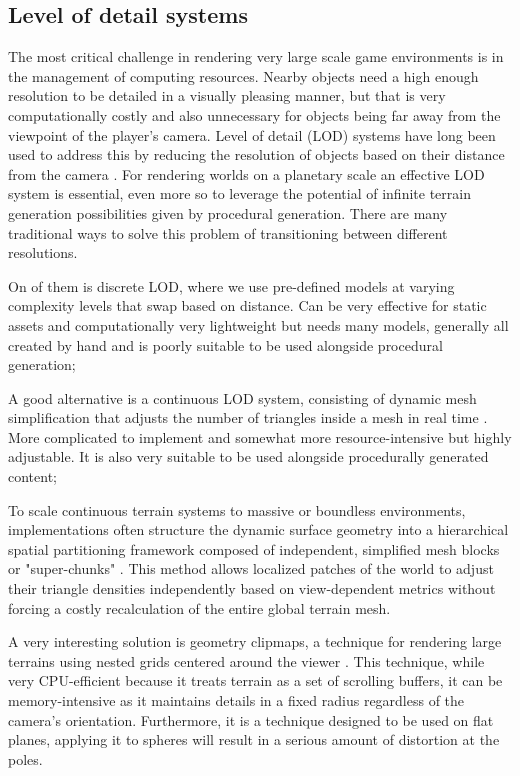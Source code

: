 \documentclass[12pt]{report}
\begin{document}
\subsection{Level of detail systems}

The most critical challenge in rendering very large scale game environments is in the management of computing resources. Nearby objects need a high enough resolution to be detailed in a visually pleasing manner, but that is very computationally costly and also unnecessary for objects being far away from the viewpoint of the player's camera. Level of detail (LOD) systems have long been used \cite{clark1976} to address this by reducing the resolution of objects based on their distance from the camera \cite{wu2010,deaconu2021}.
For rendering worlds on a planetary scale an effective LOD system is essential, even more so to leverage the potential of infinite terrain generation possibilities given by procedural generation. There are many traditional ways to solve this problem of transitioning between different resolutions.

On of them is discrete LOD, where we use pre-defined models at varying complexity levels that swap based on distance. Can be very effective for static assets and computationally very lightweight but needs many models, generally all created by hand and is poorly suitable to be used alongside procedural generation;

A good alternative is a continuous LOD system, consisting of dynamic mesh simplification that adjusts the number of triangles inside a mesh in real time \cite{lindstrom1996}. More complicated to implement and somewhat more resource-intensive but highly adjustable. It is also very suitable to be used alongside procedurally generated content;

To scale continuous terrain systems to massive or boundless environments, implementations often structure the dynamic surface geometry into a hierarchical spatial partitioning framework composed of independent, simplified mesh blocks or "super-chunks" \cite{ulrich2002superchunks}. This method allows localized patches of the world to adjust their triangle densities independently based on view-dependent metrics without forcing a costly recalculation of the entire global terrain mesh.

A very interesting solution is geometry clipmaps, a technique for rendering large terrains using nested grids centered around the viewer \cite{hugues2005}. This technique, while very CPU-efficient because it treats terrain as a set of scrolling buffers, it can be memory-intensive as it maintains details in a fixed radius regardless of the camera's orientation. Furthermore, it is a technique designed to be used on flat planes, applying it to spheres will result in a serious amount of distortion at the poles.
\end{document}
